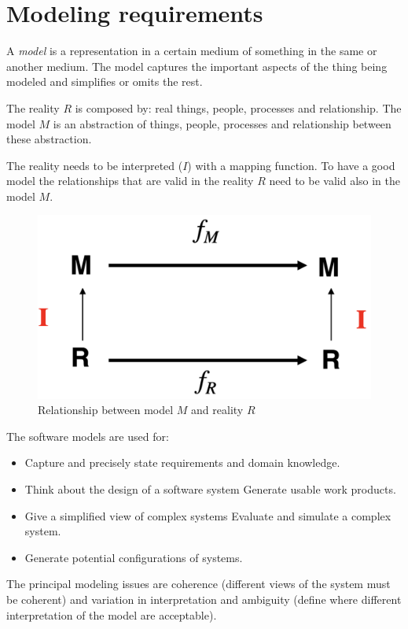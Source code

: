 \documentclass[12pt, a4paper]{report}
\newtheorem[style=M,bodystyle=\normalfont]{theorem}{Theorem}
\newtheorem[style=M,bodystyle=\normalfont]{corollary}{Corollary}
\newtheorem[style=M,bodystyle=\normalfont]{lemma}{Lemma}
\newtheorem[style=M,bodystyle=\normalfont]{definition}{Definition}
\begin{document}
\section{Modeling requirements}
    \begin{definition}
        A \emph{model} is a representation in a certain medium of something in the same or another medium. The model captures the important aspects of the thing being modeled and simplifies or omits the rest. 
    \end{definition}
    The reality $R$ is composed by: real things, people, processes and relationship. The model $M$ is an abstraction of things, people, processes and relationship between these abstraction. 
    \par
    The reality needs to be interpreted ($I$) with a mapping function. To have a good model the relationships that are valid in the reality $R$ need to be valid also in the model $M$.
    \begin{figure}
        \centering
        \includegraphics[width=1\linewidth]{images/modeling.png}
        \caption{Relationship between model $M$ and reality $R$}
    \end{figure}
    The software models are used for: 
    \begin{itemize}
        \item Capture and precisely state requirements and domain knowledge.
        \item Think about the design of a software system Generate usable work products.
        \item Give a simplified view of complex systems Evaluate and simulate a complex system.
        \item Generate potential configurations of systems.
    \end{itemize}
    The principal modeling issues are coherence (different views of the system must be coherent) and variation in interpretation and ambiguity (define where different interpretation of the model are acceptable).
\end{document}
